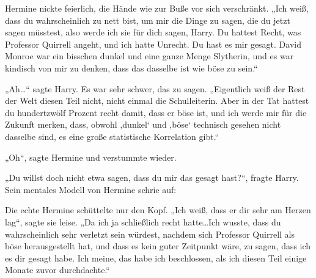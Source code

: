 Hermine nickte feierlich, die Hände wie zur Buße vor sich verschränkt.
„Ich weiß, dass du wahrscheinlich zu nett bist, um mir die Dinge zu sagen, die du jetzt sagen müsstest, also werde ich sie für dich sagen, Harry. Du hattest Recht, was Professor Quirrell angeht, und ich hatte Unrecht. Du hast es mir gesagt. David Monroe war ein bisschen dunkel und eine ganze Menge Slytherin, und es war kindisch von mir zu denken, dass das dasselbe ist wie böse zu sein.“

„Ah…“ sagte Harry. Es war sehr schwer, das zu sagen. „Eigentlich weiß der Rest der Welt diesen Teil nicht, nicht einmal die Schulleiterin. Aber in der Tat hattest du hundertzwölf Prozent recht damit, dass er böse ist, und ich werde mir für die Zukunft merken, dass, obwohl ‚dunkel‘ und ‚böse‘ technisch gesehen nicht dasselbe sind, es eine große statistische Korrelation gibt.“

„Oh“, sagte Hermine und verstummte wieder.

„Du willst doch nicht etwa sagen, dass du mir das gesagt hast?“, fragte Harry.
Sein mentales Modell von Hermine schrie auf:

Die echte Hermine schüttelte nur den Kopf. „Ich weiß, dass er dir sehr am Herzen lag“, sagte sie leise. „Da ich ja schließlich recht hatte…Ich wusste, dass du wahrscheinlich sehr verletzt sein würdest, nachdem sich Professor Quirrell als böse herausgestellt hat, und dass es kein guter Zeitpunkt wäre, zu sagen, dass ich es dir gesagt habe. Ich meine, das habe ich beschlossen, als ich diesen Teil einige Monate zuvor durchdachte.“

